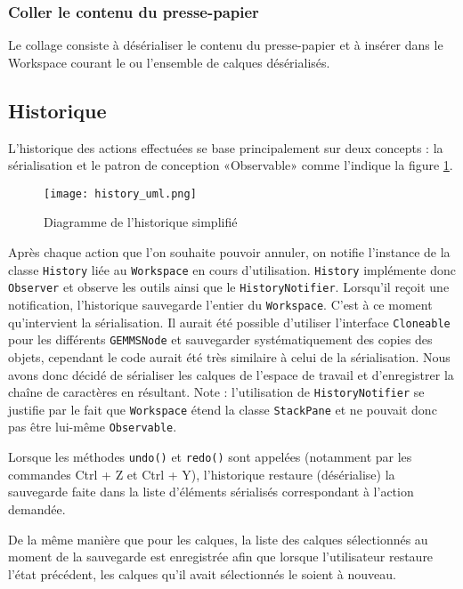 \subsubsection{Coller le contenu du presse-papier}
Le collage consiste à désérialiser le contenu du presse-papier et à insérer dans le Workspace courant le ou l'ensemble de calques désérialisés.

\subsection{Historique}
L'historique des actions effectuées se base principalement sur deux concepts : la sérialisation et le patron de conception «Observable» comme l'indique la figure \ref{fig:hist_uml}.

\begin{figure}[h]
    \caption{Diagramme de l'historique simplifié}
    \centering
    \texttt{[image: history\_uml.png]}
    \label{fig:hist_uml}
\end{figure}

Après chaque action que l'on souhaite pouvoir annuler, on notifie l'instance de la classe \texttt{History} liée au \texttt{Workspace} en cours d'utilisation. \texttt{History} implémente donc \texttt{Observer} et observe les outils ainsi que le \texttt{HistoryNotifier}. Lorsqu'il reçoit une notification, l'historique sauvegarde l'entier du \texttt{Workspace}. C'est à ce moment qu'intervient la sérialisation. Il aurait été possible d'utiliser l'interface \texttt{Cloneable} pour les différents \texttt{GEMMSNode} et sauvegarder systématiquement des copies des objets, cependant le code aurait été très similaire à celui de la sérialisation. Nous avons donc décidé de sérialiser les calques de l'espace de travail et d'enregistrer la chaîne de caractères en résultant. Note : l'utilisation de \texttt{HistoryNotifier} se justifie par le fait que \texttt{Workspace} étend la classe \texttt{StackPane} et ne pouvait donc pas être lui-même \texttt{Observable}.

Lorsque les méthodes \texttt{undo()} et \texttt{redo()} sont appelées (notamment par les commandes Ctrl + Z et Ctrl + Y), l'historique restaure (désérialise) la sauvegarde faite dans la liste d'éléments sérialisés correspondant à l'action demandée.

De la même manière que pour les calques, la liste des calques sélectionnés au moment de la sauvegarde est enregistrée afin que lorsque l'utilisateur restaure l'état précédent, les calques qu'il avait sélectionnés le soient à nouveau.

